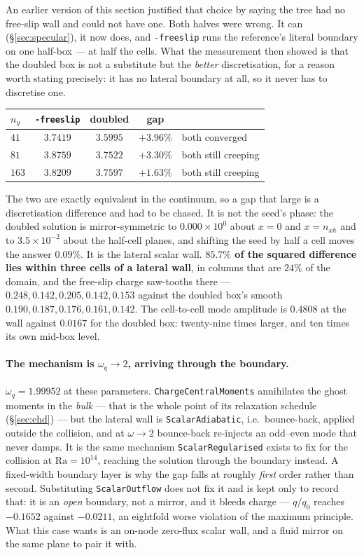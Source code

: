 \documentclass[11pt,a4paper]{article}
\newcommand{\code}[1]{\texttt{\small #1}}
\newcommand{\e}[1]{\times 10^{#1}}
\begin{document}
An earlier version of this section justified that choice by saying the tree had
no free-slip wall and could not have one. Both halves were wrong. It can
(\S\ref{sec:specular}), it now does, and \code{-freeslip} runs the reference's
literal boundary on one half-box --- at half the cells. What the measurement then
showed is that the doubled box is not a substitute but the \emph{better}
discretisation, for a reason worth stating precisely: it has no lateral boundary
at all, so it never has to discretise one.

\begin{center}\small
\begin{tabular}{lcccl}
\toprule
$n_y$ & \code{-freeslip} & doubled & gap & \\
\midrule
$41$  & $3.7419$ & $3.5995$ & $+3.96\%$ & both converged \\
$81$  & $3.8759$ & $3.7522$ & $+3.30\%$ & both still creeping \\
$163$ & $3.8209$ & $3.7597$ & $+1.63\%$ & both still creeping \\
\bottomrule
\end{tabular}
\end{center}

\noindent The two are exactly equivalent in the continuum, so a gap that large is
a discretisation difference and had to be chased. It is not the seed's phase: the
doubled solution is mirror-symmetric to $0.000\e{0}$ about $x=0$ and $x=n_{xh}$
and to $3.5\e{-2}$ about the half-cell planes, and shifting the seed by half a
cell moves the answer $0.09\%$. It is the lateral scalar wall.
\textbf{$85.7\%$ of the squared difference lies within three cells of a lateral
wall}, in columns that are $24\%$ of the domain, and the free-slip charge
saw-tooths there --- $0.248, 0.142, 0.205, 0.142, 0.153$ against the doubled
box's smooth $0.190, 0.187, 0.176, 0.161, 0.142$. The cell-to-cell mode amplitude
is $0.4808$ at the wall against $0.0167$ for the doubled box: twenty-nine times
larger, and ten times its own mid-box level.

\paragraph{The mechanism is $\omega_q\to2$, arriving through the boundary.}
$\omega_q=1.99952$ at these parameters. \code{ChargeCentralMoments} annihilates
the ghost moments in the \emph{bulk} --- that is the whole point of its
relaxation schedule (\S\ref{sec:ehd}) --- but the lateral wall is
\code{ScalarAdiabatic}, i.e.\ bounce-back, applied outside the collision, and at
$\omega\to2$ bounce-back re-injects an odd--even mode that never damps. It is the
same mechanism \code{ScalarRegularised} exists to fix for the collision at
$\mathrm{Ra}=10^{14}$, reaching the solution through the boundary instead. A
fixed-width boundary layer is why the gap falls at roughly \emph{first} order
rather than second. Substituting \code{ScalarOutflow} does not fix it and is kept
only to record that: it is an \emph{open} boundary, not a mirror, and it bleeds
charge --- $q/q_0$ reaches $-0.1652$ against $-0.0211$, an eightfold worse
violation of the maximum principle. What this case wants is an on-node zero-flux
scalar wall, and a fluid mirror on the same plane to pair it with.
\end{document}
